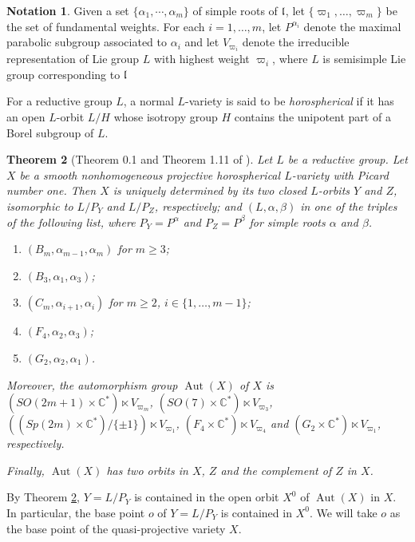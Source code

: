 \documentclass[12pt]{amsart}
\theoremstyle{plain}
\newtheorem{theorem} {Theorem} [section]
\theoremstyle{definition}
\newtheorem{notation} [theorem]  {Notation}
\def\Aut{\operatorname{Aut}}
\begin{document}
\begin{notation} Given a set $\{\alpha_1, \cdots, \alpha_m \}$ of simple roots of  $\frak l$, let $\{\varpi_1, \dots, \varpi_m\}$ be the set of fundamental weights. For each $i=1, \dots, m$, let $P^{\alpha_i}$ denote the maximal parabolic subgroup associated to $\alpha_i$ and let $V_{\varpi_i}$ denote the irreducible representation of Lie group $L$ with highest weight $\varpi_i$, where $L$ is semisimple Lie group corresponding to $\frak l$
\end{notation}


For a reductive   group $L$, a normal $L$-variety is said to be \emph{horospherical} if
it has an open $L$-orbit $L/H$ whose isotropy group $H$ contains the unipotent part of a Borel subgroup of $L$.


\begin{theorem}[Theorem 0.1 and Theorem 1.11 of \cite{Pa}]\label{Horospheical}
Let $L$ be a reductive group.
 Let $X$ be a smooth nonhomogeneous projective horospherical $L$-variety with Picard number one.
 Then $X$ is uniquely determined by its two closed $L$-orbits $ Y$ and $Z$, isomorphic to $L/P_Y$ and $L/P_Z$, respectively; and $(L, \alpha, \beta)$ in one of the triples of the following list, where $P_Y=P^\alpha$ and $P_Z=P^\beta$ for simple roots $\alpha$ and $\beta$.
 \begin{enumerate}
   \item[\rm(1)] $(B_m,{\alpha_{m-1}},{\alpha_{m}})$ for $m\geq3$;
   \item[\rm(2)] $(B_3,{\alpha_{1}},{\alpha_{3}})$;
   \item[\rm(3)] $(C_m,{\alpha_{i+1}},{\alpha_{i}})$ for $m\geq2$, $i\in \{1,\ldots, m-1\}$;
   \item[\rm(4)] $(F_4,{\alpha_{2}},{\alpha_3})$;
   \item[\rm(5)] $(G_2,{\alpha_{2}},{\alpha_1})$.
 \end{enumerate}
  Moreover, the automorphism group $\Aut(X)$ of $X$ is
  $(SO(2m+1)\times \mathbb C^*)\ltimes V_{\varpi_m}$,   $(SO(7)\times \mathbb C^*)\ltimes V_{\varpi_3}$,  $((Sp(2m)\times \mathbb C^*)/\{\pm1\})\ltimes V_{\varpi_1}$,    $(F_4\times \mathbb C^*)\ltimes V_{\varpi_4}$  and $(G_2\times \mathbb C^*)\ltimes V_{\varpi_1}$, respectively.

  Finally, $\Aut(X)$ has two orbits in $X$,   $Z$ and the complement of $Z$ in $X$.
\end{theorem}

By Theorem \ref{Horospheical}, $Y=L/P_Y$ is contained in the open orbit $X^0$ of $\Aut(X)$ in $X$. In particular,  the base point $o$ of $Y=L/P_Y$ is contained in $X^0$. We will take $o$ as the base point of the quasi-projective variety $X$.
\end{document}
